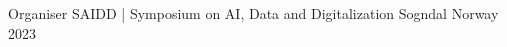 

\begin{cvhonors}

  \cvhonor
    {Organiser} %
    {SAIDD | Symposium on AI, Data and Digitalization} %
    {Sogndal Norway} %
    {2023} %

\end{cvhonors}
